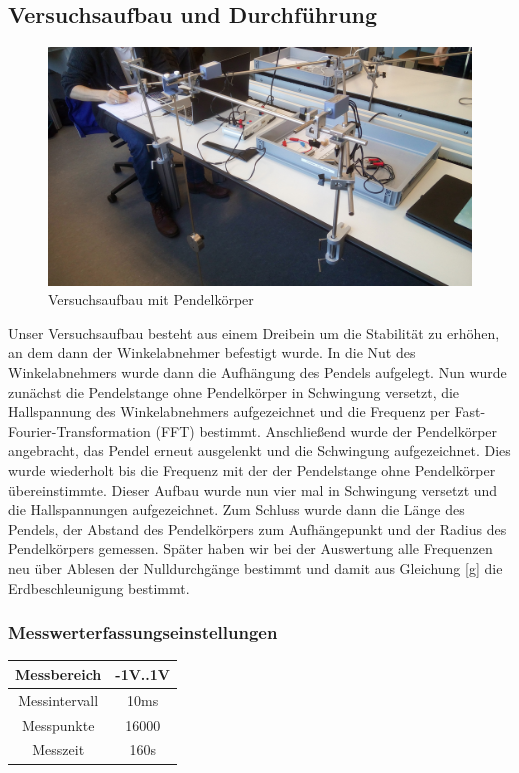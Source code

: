 \documentclass[12pt,a4paper]{article}
\begin{document}
\subsection{Versuchsaufbau und Durchführung}
\begin{figure}[H]
\centering
\includegraphics[scale=0.1]{Bilder/Einzelpendel.jpg}
\caption{Versuchsaufbau mit Pendelkörper}
\end{figure}
Unser Versuchsaufbau besteht aus einem Dreibein um die Stabilität zu erhöhen, an dem dann der Winkelabnehmer befestigt wurde. \newline
In die Nut des Winkelabnehmers wurde dann die Aufhängung des Pendels aufgelegt.
Nun wurde zunächst die Pendelstange ohne Pendelkörper in Schwingung versetzt, die Hallspannung des Winkelabnehmers aufgezeichnet und die Frequenz per Fast-Fourier-Transformation (FFT) bestimmt. \newline
Anschließend wurde der Pendelkörper angebracht, das Pendel erneut ausgelenkt und die Schwingung aufgezeichnet. 
Dies wurde wiederholt bis die Frequenz mit der der Pendelstange ohne Pendelkörper übereinstimmte.
Dieser Aufbau wurde nun vier mal in Schwingung versetzt und die Hallspannungen aufgezeichnet.
Zum Schluss wurde dann die Länge des Pendels, der Abstand des Pendelkörpers zum Aufhängepunkt und der Radius des Pendelkörpers gemessen.
\newline
Später haben wir bei der Auswertung alle Frequenzen neu über Ablesen der Nulldurchgänge bestimmt und damit aus Gleichung \ref{g} die Erdbeschleunigung bestimmt.
\subsubsection{Messwerterfassungseinstellungen}
\begin{center}
\begin{tabular}{c|c}
Messbereich & -1V..1V \\ 
\hline
Messintervall & 10ms \\ 
\hline
Messpunkte & 16000 \\ 
\hline
Messzeit & 160s \\ 
\end{tabular} 
\end{center}
\newpage
\end{document}
